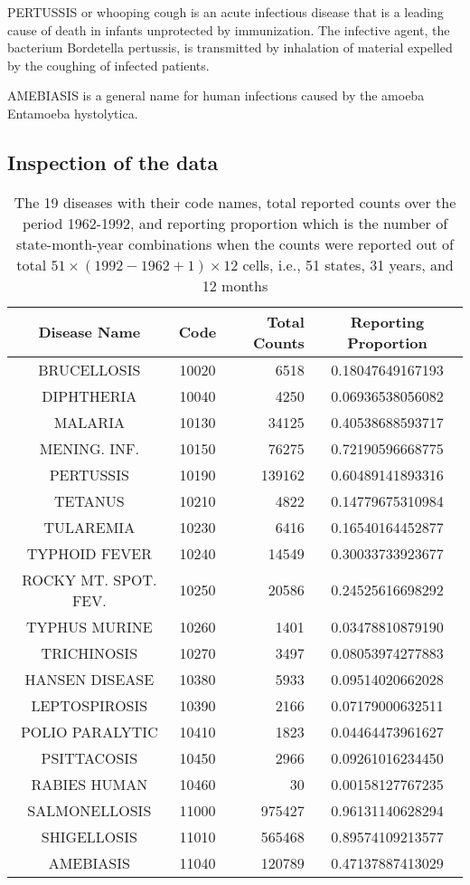 PERTUSSIS or whooping cough is an acute infectious disease that is a
leading cause of death in infants unprotected by immunization. The
infective agent, the bacterium Bordetella pertussis, is transmitted
by inhalation of material expelled by the coughing of infected
patients.

AMEBIASIS is a general name for human infections caused by the
amoeba Entamoeba hystolytica.



\subsection{Inspection of the data}

\begin{table}
\begin{tabular}{|c|c|r|c|}\hline
  Disease Name & Code & Total Counts & Reporting Proportion \\ 
  \hline BRUCELLOSIS & 10020 & 6518 & 0.18047649167193 \\ DIPHTHERIA
  & 10040 & 4250 & 0.06936538056082 \\ MALARIA & 10130 & 34125 &
  0.40538688593717 \\ MENING. INF.  & 10150 & 76275 &
  0.72190596668775 \\ PERTUSSIS & 10190 & 139162 & 0.60489141893316
  \\ TETANUS & 10210 & 4822 & 0.14779675310984 \\ TULAREMIA & 10230
  & 6416 & 0.16540164452877 \\ TYPHOID FEVER & 10240 & 14549 &
  0.30033733923677 \\ ROCKY MT. SPOT. FEV. & 10250 & 20586 &
  0.24525616698292 \\ TYPHUS MURINE & 10260 & 1401 &
  0.03478810879190 \\ TRICHINOSIS & 10270 & 3497 & 0.08053974277883
  \\ HANSEN DISEASE & 10380 & 5933 & 0.09514020662028 \\ 
  LEPTOSPIROSIS & 10390 & 2166 & 0.07179000632511 \\ POLIO PARALYTIC
  & 10410 & 1823 & 0.04464473961627 \\ PSITTACOSIS & 10450 & 2966 &
  0.09261016234450 \\ RABIES HUMAN & 10460 & 30 & 0.00158127767235
  \\ SALMONELLOSIS & 11000 & 975427 & 0.96131140628294 \\ 
  SHIGELLOSIS & 11010 & 565468 & 0.89574109213577 \\ AMEBIASIS &
  11040 & 120789 & 0.47137887413029 \\ \hline
\end{tabular}
\protect\caption{The 19 diseases with their code names, total
  reported counts over the period 1962-1992, and reporting
  proportion which is the number of state-month-year combinations
  when the counts were reported out of total $51 \times (1992-1962 +
  1) \times 12$ cells, i.e., 51 states, 31 years, and 12 months}
\end{table}


